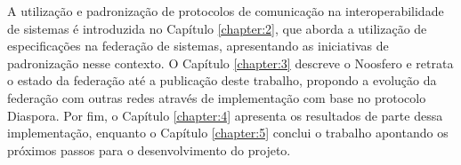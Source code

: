 A utilização e padronização de protocolos de comunicação na interoperabilidade de
sistemas é introduzida no Capítulo \ref{chapter:2}, que aborda a utilização de
especificações na federação de sistemas, apresentando as iniciativas de padronização
nesse contexto. O Capítulo \ref{chapter:3} descreve o Noosfero e retrata o estado da
federação até a publicação deste trabalho, propondo a evolução da federação com
outras redes através de implementação com base no protocolo Diaspora. Por fim, o
Capítulo \ref{chapter:4} apresenta os resultados de parte dessa implementação,
enquanto o Capítulo \ref{chapter:5} conclui o trabalho apontando os próximos passos
para o desenvolvimento do projeto.
